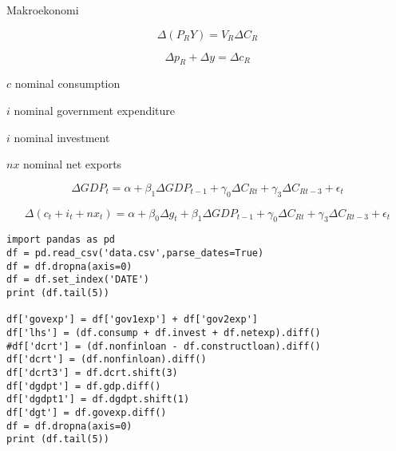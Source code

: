 \documentclass[12pt,fleqn]{article}\usepackage{../../common}
\begin{document}
Makroekonomi

$$ \Delta (P_RY) = V_R\Delta C_R$$

$$ \Delta p_R + \Delta y = \Delta c_R$$




$c$ nominal consumption 

$i$ nominal government expenditure

$i$ nominal investment 

$nx$ nominal net exports

$$ \Delta GDP_t = 
\alpha + \beta_1 \Delta GDP_{t-1} + 
\gamma_0 \Delta C_{Rt} + \gamma_3 \Delta C_{Rt-3} + \epsilon_t 
$$

$$ 
\Delta (c_t + i_t + nx_t) = 
\alpha + \beta_0 \Delta g_t + \beta_1 \Delta GDP_{t-1} + 
\gamma_0 \Delta C_{Rt} + \gamma_3 \Delta C_{Rt-3} + \epsilon_t 
$$


\begin{verbatim}
import pandas as pd
df = pd.read_csv('data.csv',parse_dates=True)
df = df.dropna(axis=0)
df = df.set_index('DATE')
print (df.tail(5))

df['govexp'] = df['gov1exp'] + df['gov2exp']
df['lhs'] = (df.consump + df.invest + df.netexp).diff()
#df['dcrt'] = (df.nonfinloan - df.constructloan).diff()
df['dcrt'] = (df.nonfinloan).diff()
df['dcrt3'] = df.dcrt.shift(3)
df['dgdpt'] = df.gdp.diff()
df['dgdpt1'] = df.dgdpt.shift(1)
df['dgt'] = df.govexp.diff()
df = df.dropna(axis=0)
print (df.tail(5))
\end{verbatim}
\end{document}
